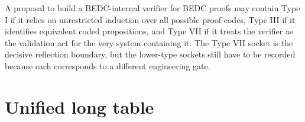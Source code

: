 \begin{example}
\label{ex:transcendental-supply-reflection-stack}
A proposal to build a BEDC-internal verifier for BEDC proofs may contain Type I if it relies on unrestricted induction over all possible proof codes, Type III if it identifies equivalent coded propositions, and Type VII if it treats the verifier as the validation act for the very system containing it. The Type VII socket is the decisive reflection boundary, but the lower-type sockets still have to be recorded because each corresponds to a different engineering gate.
\end{example}

\section{Unified long table}
\label{sec:transcendental-supply-unified-table}

